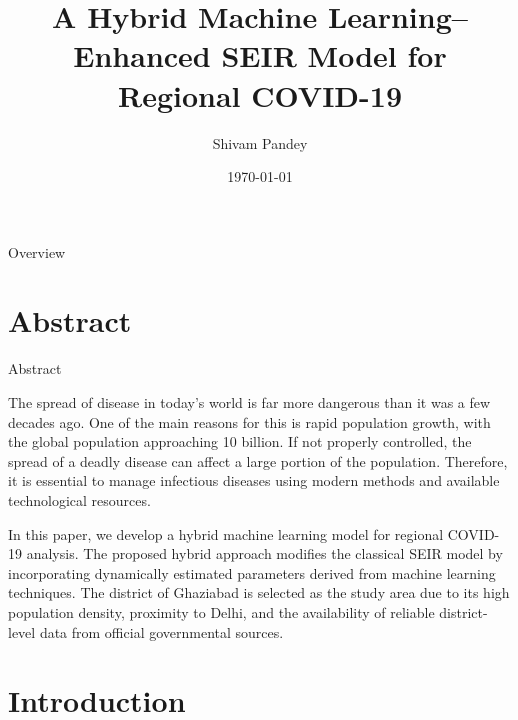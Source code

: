 \documentclass{beamer}
\title[Hybrid SEIR Model]{A Hybrid Machine Learning–Enhanced SEIR Model for Regional COVID-19}
\author{Shivam Pandey}
\institute{Department of Mathematics \\ Shivaji College \\ University of Delhi}
\date{\today}
\begin{document}
\begin{frame}
\titlepage
\end{frame}

\begin{frame}{Overview}
\tableofcontents
\end{frame}

\section{Abstract}

\begin{frame}{Abstract}

The spread of disease in today’s world is far more dangerous than it was a few decades ago. One of the main reasons for this is rapid population growth, with the global population approaching 10 billion. If not properly controlled, the spread of a deadly disease can affect a large portion of the population. Therefore, it is essential to manage infectious diseases using modern methods and available technological resources.

In this paper, we develop a hybrid machine learning model for regional COVID-19 analysis. The proposed hybrid approach modifies the classical SEIR model by incorporating dynamically estimated parameters derived from machine learning techniques. The district of Ghaziabad is selected as the study area due to its high population density, proximity to Delhi, and the availability of reliable district-level data from official governmental sources.

\end{frame}

\section{Introduction}
\end{document}

